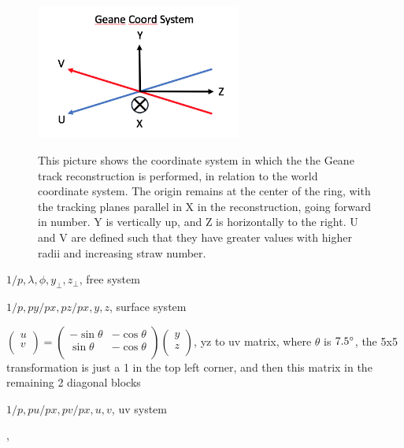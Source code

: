 \documentclass{article}
\begin{document}
\begin{figure}[]
\caption{This picture shows the coordinate system in which the the Geane track reconstruction is performed, in relation to the world coordinate system. The origin remains at the center of the ring, with the tracking planes parallel in X in the reconstruction, going forward in number. Y is vertically up, and Z is horizontally to the right. U and V are defined such that they have greater values with higher radii and increasing straw number.}
\centering
\includegraphics[width=0.6\textwidth]{GeaneCoordSys}
\label{fig:GeaneCoordSys}
\end{figure}


$1/p, \lambda, \phi, y_{\perp}, z_{\perp}$, free system

$1/p, py/px, pz/px, y, z$, surface system

$
\begin{pmatrix}
u \\
v \\
\end{pmatrix} =
\begin{pmatrix}
-\sin{\theta} & -\cos{\theta} \\
\sin{\theta} & -\cos{\theta} \\
\end{pmatrix}
\begin{pmatrix}
y \\
z \\
\end{pmatrix}
$, yz to uv matrix, where $\theta$ is $7.5\degree$, the 5x5 transformation is just a 1 in the top left corner, and then this matrix in the remaining 2 diagonal blocks

$1/p, pu/px, pv/px, u, v$, uv system





\cite{jacob}, \cite{energyloss}
\end{document}
